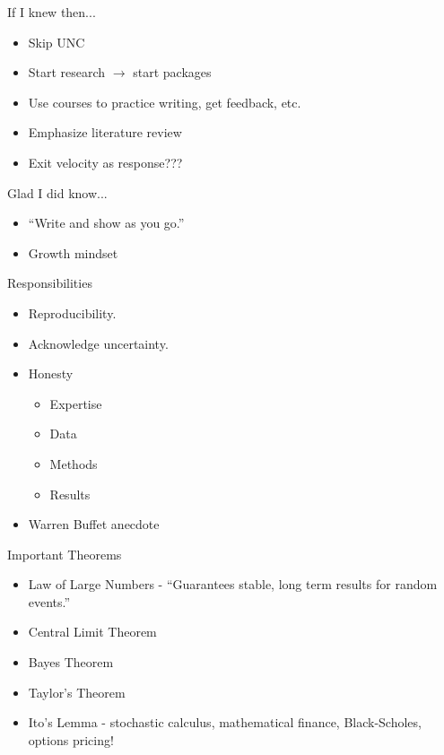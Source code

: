 \documentclass{beamer}
\begin{document}
\begin{frame}{If I knew then...}
  \begin{itemize}
  \addtolength{\itemsep}{0.5\baselineskip}
  \item Skip UNC
  \item Start research $\rightarrow$ start packages
  \item Use courses to practice writing, get feedback, etc.
  \item Emphasize literature review
  \item Exit velocity as response???
  \end{itemize}
Glad I did know...
  \begin{itemize}
  \addtolength{\itemsep}{0.5\baselineskip}
  \item ``Write and show as you go.''
  \item Growth mindset
  \end{itemize}

\end{frame}

\begin{frame}{Responsibilities}
    \begin{itemize}
    \addtolength{\itemsep}{0.5\baselineskip}
    \item Reproducibility.
    \item Acknowledge uncertainty.
    \item Honesty
          \begin{itemize}
          \addtolength{\itemsep}{0.5\baselineskip}
          \item Expertise
          \item Data
          \item Methods
          \item Results
          \end{itemize}
    \item Warren Buffet anecdote
    \end{itemize}
\end{frame}

\begin{frame}{Important Theorems}
    \begin{itemize}
    \addtolength{\itemsep}{0.5\baselineskip}
    \item Law of Large Numbers - ``Guarantees stable, long term results for random events.''
    \item Central Limit Theorem
    \item Bayes Theorem
    \item Taylor's Theorem
    \item Ito's Lemma - stochastic calculus, mathematical finance, Black-Scholes, options pricing!
    \end{itemize}
\end{frame}
\end{document}
